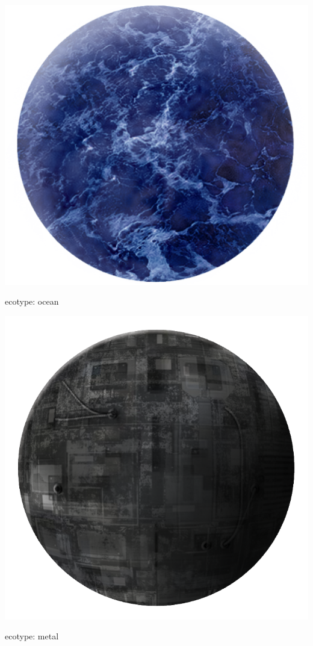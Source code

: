 \begin{marginfigure}
	\includegraphics{res/planets/OceanPlanet.png}
	\caption{ecotype: ocean}
	\label{fig:model:oceanPlanet}
\end{marginfigure}

\begin{marginfigure}
	\includegraphics{res/planets/metal-planet.png}
	\caption{ecotype: metal}
	\label{fig:model:metalPlanet}
\end{marginfigure}






 


% 